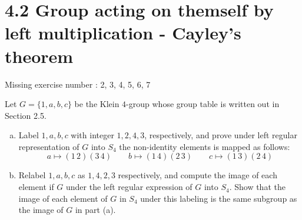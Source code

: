 \documentclass{article}
\newenvironment{problem}[2][Problem]{\begin{trivlist}
\item[\hskip \labelsep {\bfseries #1}\hskip \labelsep {\bfseries #2.}]}{\end{trivlist}}
\begin{document}
\section*{4.2 Group acting on themself by left multiplication - Cayley's theorem}
Missing exercise number : 2, 3, 4, 5, 6, 7
\begin{problem}{1}
    Let $G=\{1, a, b, c\}$ be the Klein $4$-group whose group table is written out in Section 2.5.
    \begin{enumerate}[(a)]
        \item Label $1, a, b, c$ with integer $1, 2, 4, 3$, respectively, and prove under left regular representation of $G$ into $S_4$ the non-identity elements is mapped as follows:
        \[
         a \mapsto (1\, 2)(3 \, 4) \qquad b \mapsto (1 \, 4)(2 \, 3) \qquad c \mapsto (1 \, 3)(2 \, 4)
        \]
        \item Relabel $1, a, b, c $ as $1, 4, 2, 3$ respectively, and compute the image of each element if $G$ under the left regular expression of $G$ into $S_4$. Show that the image of each element of $G$ in $S_4$ under this labeling is the same subgroup as the image of $G$ in part (a). 
    \end{enumerate}
\end{problem}
\end{document}
